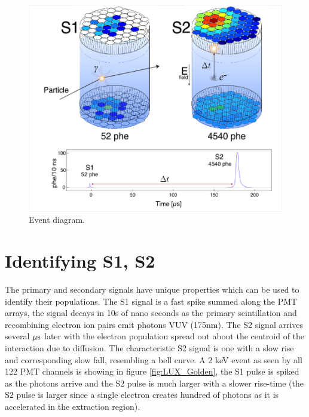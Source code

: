  \begin{figure}[h!]\centering
\includegraphics[width=150mm]{Chapter_LUX_Det/LUX_Event_Diagram.png}
\caption{Event diagram.}
\label{fig:LUX_Event}
\end{figure}

\section{Identifying S1, S2}
The primary and secondary signals have unique properties which can be used to identify their populations. The S1 signal is a fast spike summed along the PMT arrays, the signal decays in 10s of nano seconds as the primary scintillation and recombining electron ion pairs emit photons VUV (175nm). The S2 signal arrives several $\rm \mu s$ later with the electron population spread out about the centroid of the interaction due to diffusion. The characteristic S2 signal is one with a slow rise and corresponding slow fall, resembling a bell curve. A 2 keV event as seen by all 122 PMT channels is showing in figure \ref{fig:LUX_Golden}, the S1 pulse is spiked as the photons arrive and the S2 pulse is much larger with a slower rise-time  (the S2 pulse is larger since a single electron creates hundred of photons as it is accelerated in the extraction region). 


